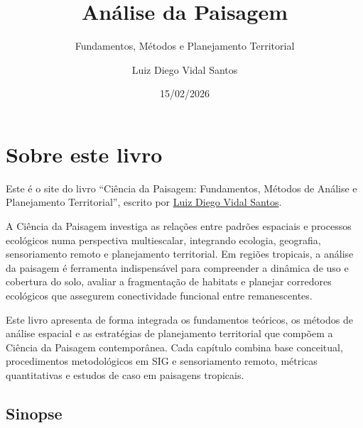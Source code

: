 \documentclass[
  portuguese,
  11pt,
  a4paper,
  open=any]{scrbook}
\title{Análise da Paisagem}
\subtitle{Fundamentos, Métodos e Planejamento Territorial}
\author{Luiz Diego Vidal Santos}
\date{15/02/2026}
\renewcommand*\contentsname{Índice}
\newcommand\contentsname{Índice}
\begin{document}
\frontmatter
\maketitle

\renewcommand*\contentsname{Índice}
{
\hypersetup{linkcolor=}
\setcounter{tocdepth}{2}
\tableofcontents
}

\mainmatter
{}

\chapter*{Sobre este livro}\label{sobre-este-livro}


Este é o site do livro ``Ciência da Paisagem: Fundamentos, Métodos de
Análise e Planejamento Territorial'', escrito por
\href{https://diegovidalcv.com.br/}{Luiz Diego Vidal Santos}.

A Ciência da Paisagem investiga as relações entre padrões espaciais e
processos ecológicos numa perspectiva multiescalar, integrando ecologia,
geografia, sensoriamento remoto e planejamento territorial. Em regiões
tropicais, a análise da paisagem é ferramenta indispensável para
compreender a dinâmica de uso e cobertura do solo, avaliar a
fragmentação de habitats e planejar corredores ecológicos que assegurem
conectividade funcional entre remanescentes.

Este livro apresenta de forma integrada os fundamentos teóricos, os
métodos de análise espacial e as estratégias de planejamento territorial
que compõem a Ciência da Paisagem contemporânea. Cada capítulo combina
base conceitual, procedimentos metodológicos em SIG e sensoriamento
remoto, métricas quantitativas e estudos de caso em paisagens tropicais.

\section*{Sinopse}\label{sinopse}

\end{document}
